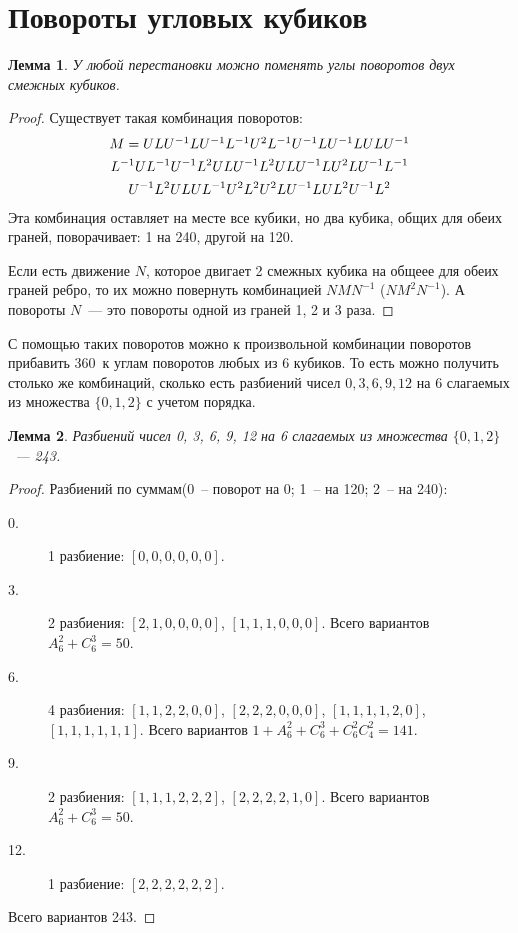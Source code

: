 \documentclass[utf8,a4paper,12pt]{article}
\newtheorem{lemma_cub}{Лемма}[section]
\begin{document}
\section{Повороты угловых кубиков}
\begin{lemma_cub}
\label{l_rot}
У любой перестановки можно поменять углы поворотов двух смежных кубиков.
\end{lemma_cub}
\begin{proof}
Существует такая комбинация поворотов:
\begin{multline*}
$$
M = ULU^{-1}LU^{-1}L^{-1}U^2L^{-1}U^{-1}LU^{-1}LULU^{-1}       \\
    L^{-1}UL^{-1}U^{-1}L^2ULU^{-1}L^2ULU^{-1}LU^2LU^{-1}L^{-1} \\
    U^{-1}L^2ULUL^{-1}U^2L^2U^2LU^{-1}LUL^2U^{-1}L^2
$$
\end{multline*}
    Эта комбинация оставляет на месте все кубики, но два кубика, общих для обеих граней, поворачивает: 1 на 240\textdegree, другой на 120\textdegree.

    Если есть движение $N$, которое двигает 2 смежных кубика на общеее для обеих граней ребро,
то их можно повернуть комбинацией $NMN^{-1}$ ($NM^2N^{-1}$).
    А повороты $N$~--- это повороты одной из граней 1, 2 и 3 раза.
\end{proof}
С помощью таких поворотов можно к произвольной комбинации поворотов
прибавить 360\textdegree~к углам поворотов любых из 6 кубиков. То есть можно получить столько же комбинаций,
сколько есть разбиений чисел $0,3,6,9,12$ на 6 слагаемых из множества $\{0,1,2\}$ с
учетом порядка.
\begin{lemma_cub}
    Разбиений чисел 0, 3, 6, 9, 12 на 6 слагаемых из множества $\{0,1,2\}$~--- 243.
\end{lemma_cub}
\begin{proof}
    Разбиений по суммам(0~-- поворот на 0\textdegree; 1~-- на 120\textdegree; 2~-- на 240\textdegree):
    \begin{description}
    \item[0.] 1 разбиение: $[0,0,0,0,0,0]$.
    \item[3.] 2 разбиения: $[2,1,0,0,0,0]$, $[1,1,1,0,0,0]$. Всего вариантов
        $A^2_6+C^3_6=50$.
    \item[6.] 4 разбиения: $[1,1,2,2,0,0]$, $[2,2,2,0,0,0]$, $[1,1,1,1,2,0]$,
        $[1,1,1,1,1,1]$. Всего вариантов $1+A^2_6+C^3_6+C^2_6C^2_4=141$.
    \item[9.] 2 разбиения: $[1,1,1,2,2,2]$, $[2,2,2,2,1,0]$. Всего вариантов
        $A^2_6+C^3_6=50$.
    \item[12.]1 разбиение: $[2,2,2,2,2,2]$.
    \end{description}
    Всего вариантов 243.
\end{proof}
\end{document}
